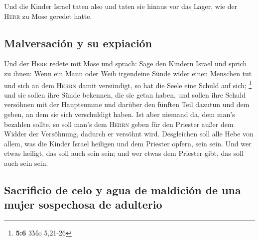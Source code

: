  Und die Kinder Israel taten also und taten sie hinaus vor
das Lager, wie der \textsc{Herr} zu Mose geredet hatte.

\hypertarget{malversaciuxf3n-y-su-expiaciuxf3n}{%
\subsection{Malversación y su
expiación}\label{malversaciuxf3n-y-su-expiaciuxf3n}}

 Und der \textsc{Herr} redete mit Mose und sprach:
 Sage den Kindern Israel und sprich zu ihnen: Wenn ein
Mann oder Weib irgendeine Sünde wider einen Menschen tut und sich an dem
\textsc{Herrn} damit versündigt, so hat die Seele eine Schuld auf sich;
\footnote{\textbf{5:6} 3Mo 5,21-26}  und sie sollen ihre
Sünde bekennen, die sie getan haben, und sollen ihre Schuld versöhnen
mit der Hauptsumme und darüber den fünften Teil dazutun und dem geben,
an dem sie sich verschuldigt haben.  Ist aber niemand da,
dem man's bezahlen sollte, so soll man's dem \textsc{Herrn} geben für
den Priester außer dem Widder der Versöhnung, dadurch er versöhnt wird.
 Desgleichen soll alle Hebe von allem, was die Kinder
Israel heiligen und dem Priester opfern, sein sein.  Und
wer etwas heiligt, das soll auch sein sein; und wer etwas dem Priester
gibt, das soll auch sein sein.

\hypertarget{sacrificio-de-celo-y-agua-de-maldiciuxf3n-de-una-mujer-sospechosa-de-adulterio}{%
\subsection{Sacrificio de celo y agua de maldición de una mujer
sospechosa de
adulterio}\label{sacrificio-de-celo-y-agua-de-maldiciuxf3n-de-una-mujer-sospechosa-de-adulterio}}

